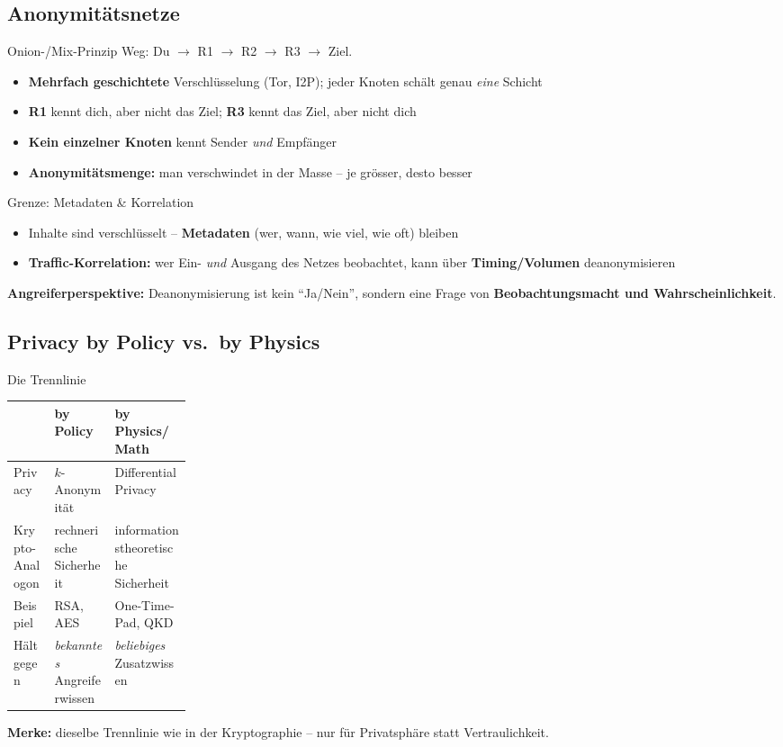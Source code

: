\documentclass[a4paper, fontsize=7pt]{scrartcl}
\renewcommand*{\arraystretch}{1.5}  %
\begin{document}
\subsection{Anonymitätsnetze}

\begin{mainbox}{Onion-/Mix-Prinzip}
Weg: Du $\to$ R1 $\to$ R2 $\to$ R3 $\to$ Ziel.
\begin{itemize}
    \item \textbf{Mehrfach geschichtete} Verschlüsselung (Tor, I2P); jeder
          Knoten schält genau \emph{eine} Schicht
    \item \textbf{R1} kennt dich, aber nicht das Ziel; \textbf{R3} kennt
          das Ziel, aber nicht dich
    \item \textbf{Kein einzelner Knoten} kennt Sender \emph{und} Empfänger
    \item \textbf{Anonymitätsmenge:} man verschwindet in der Masse --
          je grösser, desto besser
\end{itemize}
\end{mainbox}

\begin{mainbox}{Grenze: Metadaten \& Korrelation}
\begin{itemize}
    \item Inhalte sind verschlüsselt -- \textbf{Metadaten} (wer, wann,
          wie viel, wie oft) bleiben
    \item \textbf{Traffic-Korrelation:} wer Ein- \emph{und} Ausgang des
          Netzes beobachtet, kann über \textbf{Timing/Volumen}
          deanonymisieren
\end{itemize}
\textbf{Angreiferperspektive:} Deanonymisierung ist kein ``Ja/Nein'',
sondern eine Frage von \textbf{Beobachtungsmacht und Wahrscheinlichkeit}.
\end{mainbox}

\subsection{Privacy by Policy vs.\ by Physics}

\begin{mainbox}{Die Trennlinie}
\renewcommand*{\arraystretch}{1.2}
\setlength{\tabcolsep}{3pt}
\begin{tabularx}{\linewidth}{@{}>{\raggedright\arraybackslash}p{0.23\linewidth}|>{\raggedright\arraybackslash}X|>{\raggedright\arraybackslash}X@{}}
 & \textbf{by Policy} & \textbf{by Physics/Math} \\
\hline
Privacy & $k$-Anonymität & Differen\-tial Privacy \\
Krypto-Analogon & rechnerische Sicherheit & informations\-theoretische
  Sicherheit \\
Beispiel & RSA, AES & One-Time-Pad, QKD \\
Hält gegen & \emph{bekanntes} Angreiferwissen & \emph{beliebiges}
  Zusatzwissen \\
\end{tabularx}
\textbf{Merke:} dieselbe Trennlinie wie in der Kryptographie -- nur für
Privatsphäre statt Vertraulichkeit.
\end{mainbox}
\end{document}
